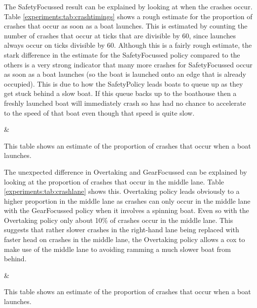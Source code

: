   The SafetyFocussed result can be explained by looking at when the crashes occur. Table \ref{experiments:tab:crashtimings} shows a rough estimate for the proportion of crashes that occur as soon as a boat launches. This is estimated by counting the number of crashes that occur at ticks that are divisible by 60, since launches always occur on ticks divisible by 60. Although this is a fairly rough estimate, the stark difference in the estimate for the SafetyFocussed policy compared to the others is a very strong indicator that many more crashes for SafetyFocussed occur as soon as a boat launches (so the boat is launched onto an edge that is already occupied). This is due to how the SafetyPolicy leads boats to queue up as they get stuck behind a slow boat. If this queue backs up to the boathouse then a freshly launched boat will immediately crash so has had no chance to accelerate to the speed of that boat even though that speed is quite slow.

  \begin{table}[h]
  \centering
  {\cp & \crashes }
  \caption{This table shows an estimate of the proportion of crashes that occur when a boat launches.}
  \label{experiments:tab:crashtimings}
  \end{table}
  
  The unexpected difference in Overtaking and GearFocussed can be explained by looking at the proportion of crashes that occur in the middle lane. Table \ref{experiments:tab:crashlane} shows this. Overtaking policy leads obviously to a higher proportion in the middle lane as crashes can only occur in the middle lane with the GearFocussed policy when it involves a spinning boat. Even so with the Overtaking policy only about 10\% of crashes occur in the middle lane. This suggests that rather slower crashes in the right-hand lane being replaced with faster head on crashes in the middle lane, the Overtaking policy allows a cox to make use of the middle lane to avoiding ramming a much slower boat from behind.
  
  \begin{table}[h]
  \centering
  {\cp & \middle }
  \caption{This table shows an estimate of the proportion of crashes that occur when a boat launches.}
  \label{experiments:tab:crashlane}
  \end{table}
  

